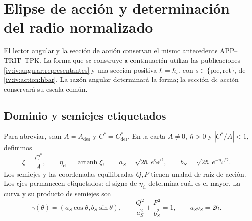 \section{Elipse de acción y determinación del radio normalizado}
\label{iv:iv:ellipse:section}

El lector angular y la sección de acción conservan el mismo
antecedente APP--TRIT--TPK. La forma que se construye a
continuación utiliza las publicaciones
\eqref{iv:iv:angular:representantes} y una sección positiva
\(\hbar=\hbar_s\), con
\(s\in\{\mathrm{pre},\mathrm{ret}\}\), de
\eqref{iv:iv:action:hbar}. La razón angular determinará la forma;
la sección de acción conservará su escala común.

\subsection{Dominio y semiejes etiquetados}
\label{iv:iv:ellipse:dominio}

Para abreviar, sean \(A=A_{\deg}\) y \(C^*=C^*_{\deg}\).
En la carta \(A\ne0\), \(\hbar>0\) y \(|C^*/A|<1\),
definimos
\begin{equation}
 \xi=\frac{C^*}{A},\qquad
 \eta_{\mathrm{el}}=\operatorname{artanh}\xi,\qquad
 a_S=\sqrt{2\hbar}\,e^{\eta_{\mathrm{el}}/2},\qquad
 b_S=\sqrt{2\hbar}\,e^{-\eta_{\mathrm{el}}/2}.
 \label{iv:iv:ellipse:semiejes}
\end{equation}
Los semiejes y las coordenadas equilibradas \(Q,P\) tienen
unidad de raíz de acción. Los ejes permanecen etiquetados:
el signo de \(\eta_{\mathrm{el}}\) determina cuál es el
mayor. La curva y su producto de semiejes son
\begin{equation}
 \gamma(\theta)=(a_S\cos\theta,b_S\sin\theta),\qquad
 \frac{Q^2}{a_S^2}+\frac{P^2}{b_S^2}=1,\qquad
 a_Sb_S=2\hbar.
 \label{iv:iv:ellipse:curva}
\end{equation}

